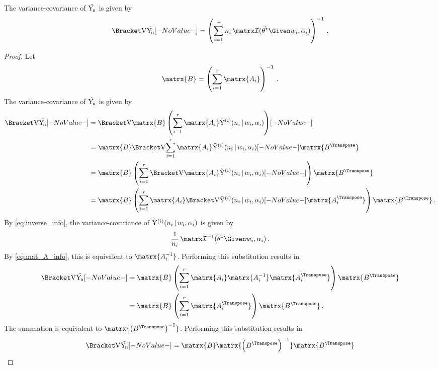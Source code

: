 \documentclass[ ../main.tex]{subfiles}
\begin{document}
\begin{theorem}
\label{thm:var_sampdu}
The variance-covariance of $\sampdu$ is given by
\begin{equation}
\label{eq:var_samp_d_full}
    \Var{\sampdu} = \left( \sum_{i=1}^{r} n_i \infomatrx(\tparam\sysparamvec \Given w_i, \alpha_i) \right)^{-1}\,.
\end{equation}
\end{theorem}
\begin{proof}
Let
\begin{equation}
\label{eq:proof_of_var_samp_d_full_mat_B}
    \matrx{B} = \left( \sum_{i=1}^{r} \matrx{A_i} \right)^{-1}\,.
\end{equation}
The variance-covariance of $\sampdu$ is given by
\begin{align}
    \Var{\sampdu}
        &= \Var{\matrx{B} \left( \sum_{i=1}^{r} \matrx{A_i} \sampdir{n_i}{w_i,\alpha_i}{i} \right)}\\
        &= \matrx{B} \Var{\sum_{i=1}^{r} \matrx{A_i} \sampdir{n_i}{w_i,\alpha_i}{i}} \matrx{B^{\Transpose}}\\
        &= \matrx{B} \left(\sum_{i=1}^{r} \Var{\matrx{A_i} 
        \sampdir{n_i}{w_i,\alpha_i}{i}}\right) \matrx{B^{\Transpose}}\\
        &= \matrx{B} \left(\sum_{i=1}^{r} \matrx{A_i} \Var{\sampdir{n_i}{w_i,\alpha_i}{i}} \matrx{A_i^{\Transpose}} \right) 
        \matrx{B^{\Transpose}}\,.
\end{align}
By \cref{eq:inverse_info}, the variance-covariance of $\sampdir{n_i}{w_i,\alpha_i}{i}$ is given by
\begin{equation}
    \frac{1}{n_i} \infomatrx^{-1}(\tparam\sysparamvec \Given w_i, \alpha_i)\,.
\end{equation}
By \cref{eq:mat_A_info}, this is equivalent to $\matrx{A_i^{-1}}$. Performing this substitution results in
\begin{align}
    \Var{\sampdu}
        &= \matrx{B} \left(\sum_{i=1}^{r} \matrx{A_i} \matrx{A_i^{-1}} 
        \matrx{A_i^{\Transpose}} \right) \matrx{B^{\Transpose}}\\
        &= \matrx{B} \left(\sum_{i=1}^{r} \matrx{A_i^{\Transpose}}\right) 
        \matrx{B^{\Transpose}}\,.
\end{align}
The summation is equivalent to $\matrx{\left({B^{\Transpose}}\right)^{-1}}$. 
Performing this substitution results in
\begin{align}
    \Var{\sampdu}
        &= \matrx{B} \matrx{\left(B^{\Transpose}\right)^{-1}} 
        \matrx{B^{\Transpose}}\\

\end{align}
\end{proof}
\end{document}
